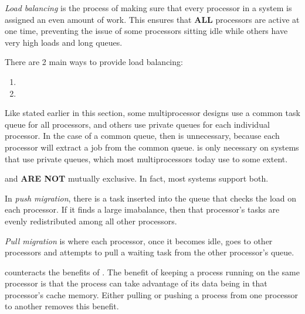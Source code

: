 \begin{definition}\label{def:Load_Balancing}
  \emph{Load balancing} is the process of making sure that every processor in a system is assigned an even amount of work.
  This ensures that \textbf{ALL} processors are active at one time, preventing the issue of some processors sitting idle while others have very high loads and long queues.

  There are 2 main ways to provide load balancing:
  \begin{enumerate}[noitemsep]
  \item {}
  \item {}
  \end{enumerate}

  \begin{remark}\label{rmk:Load_Balancing_Common_Private_Queues}
    Like stated earlier in this section, some multiprocessor designs use a common task queue for all processors, and others use private queues for each individual processor.
    In the case of a common queue, then  is unnecessary, because each processor will extract a job from the common queue.
     is only necessary on systems that use private queues, which most multiprocessors today use to some extent.
  \end{remark}
\end{definition}

 and  \textbf{ARE NOT} mutually exclusive.
In fact, most systems support both.

\begin{definition}\label{def:Push_Migration}
  In \emph{push migration}, there is a task inserted into the queue that checks the load on each processor.
  If it finds a large imabalance, then that processor's tasks are evenly redistributed among all other processors.
\end{definition}

\begin{definition}\label{def:Pull_Migration}
  \emph{Pull migration} is where each processor, once it becomes idle, goes to other processors and attempts to pull a waiting task from the other processor's queue.
\end{definition}

 counteracts the benefits of .
The benefit of keeping a process running on the same processor is that the process can take advantage of its data
being in that processor’s cache memory.
Either pulling or pushing a process from one processor to another removes this benefit.

